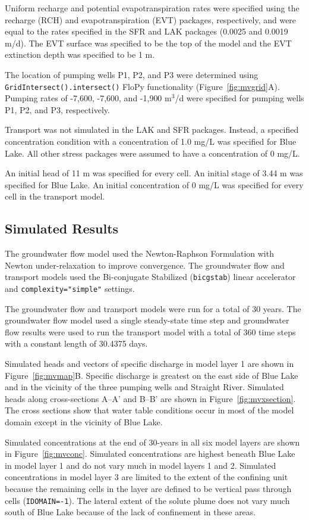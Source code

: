 \documentclass[12pt, oneside]{article}  	%
\begin{document}
Uniform recharge and potential evapotranspiration rates were specified using the recharge (RCH) and evapotranspiration (EVT) packages, respectively, and were equal to the rates specified in the SFR and LAK packages (0.0025 and 0.0019 m/d). The EVT surface was specified to be the top of the model and the EVT extinction depth was specified to be 1 m.

The location of pumping wells P1, P2, and P3 were determined using \texttt{GridIntersect().intersect()} FloPy functionality (Figure~\ref{fig:mvgrid}A). Pumping rates of -7,600, -7,600, and -1,900 m$^3$/d were specified for pumping wells P1, P2, and P3, respectively.

Transport was not simulated in the LAK and SFR packages. Instead, a specified concentration condition with a concentration of 1.0 mg/L was specified for Blue Lake. All other stress packages were assumed to have a concentration of 0 mg/L.

An initial head of 11 m was specified for every cell. An initial stage of 3.44 m was specified for Blue Lake. An initial concentration of 0 mg/L was specified for every cell in the transport model.

\subsection*{Simulated Results}
The groundwater flow model used the Newton-Raphson Formulation with Newton under-relaxation to improve convergence. The groundwater flow and transport models used the Bi-conjugate Stabilized (\texttt{bicgstab}) linear accelerator and \texttt{complexity="simple"} settings.
 
The groundwater flow and transport models were run for a total of 30 years. The groundwater flow model used a single steady-state time step and groundwater flow results were used to run the transport model with a total of 360 time steps with a constant length of 30.4375 days.
 
Simulated heads and vectors of specific discharge in model layer 1 are shown in Figure~\ref{fig:mvmap}B. Specific discharge is greatest on the east side of Blue Lake and in the vicinity of the three pumping wells and Straight River. Simulated heads along cross-sections A--A' and B--B' are shown in Figure~\ref{fig:mvxsection}. The cross sections show that water table conditions occur in most of the model domain except in the vicinity of Blue Lake.

Simulated concentrations at the end of 30-years in all six model layers are shown in Figure~\ref{fig:mvconc}. Simulated concentrations are highest beneath Blue Lake in model layer 1 and do not vary much in model layers 1 and 2. Simulated concentrations in model layer 3 are limited to the extent of the confining unit because the remaining cells in the layer are defined to be vertical pass through cells (\texttt{IDOMAIN=-1}). The lateral extent of the solute plume does not vary much south of Blue Lake because of the lack of confinement in these areas.
\end{document}
